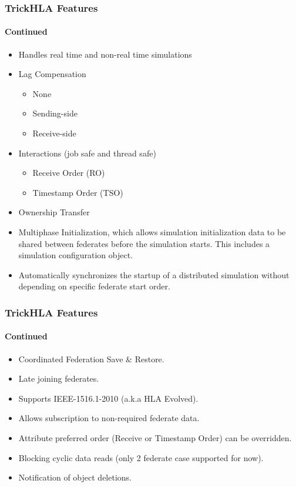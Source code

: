 \documentclass{beamer}
\begin{document}
   \begin{frame}
      \frametitle{TrickHLA Features}
      \framesubtitle{Continued}
      \begin{itemize}
         \item Handles real time and non-real time simulations
         \item Lag Compensation
         \begin{itemize}
            \item None
            \item Sending-side
            \item Receive-side
            \end{itemize}
         \item Interactions (job safe and thread safe)
         \begin{itemize}
            \item Receive Order (RO)
            \item Timestamp Order (TSO)
         \end{itemize}
         \item Ownership Transfer
         \item Multiphase Initialization, which allows simulation initialization data to be shared between federates before the simulation starts. This includes a simulation configuration object.
         \item Automatically synchronizes the startup of a distributed simulation without depending on specific federate start order.
      \end{itemize}
   \end{frame}
   
   \begin{frame}
      \frametitle{TrickHLA Features}
      \framesubtitle{Continued}
      \begin{itemize}
         \item Coordinated Federation Save \& Restore.
         \item Late joining federates.
         \item Supports IEEE-1516.1-2010 (a.k.a HLA Evolved).
         \item Allows subscription to non-required federate data.
         \item Attribute preferred order (Receive or Timestamp Order) can be overridden.
         \item Blocking cyclic data reads (only 2 federate case supported for now).
         \item Notification of object deletions.
      \end{itemize}
   \end{frame}
   
\end{document}
